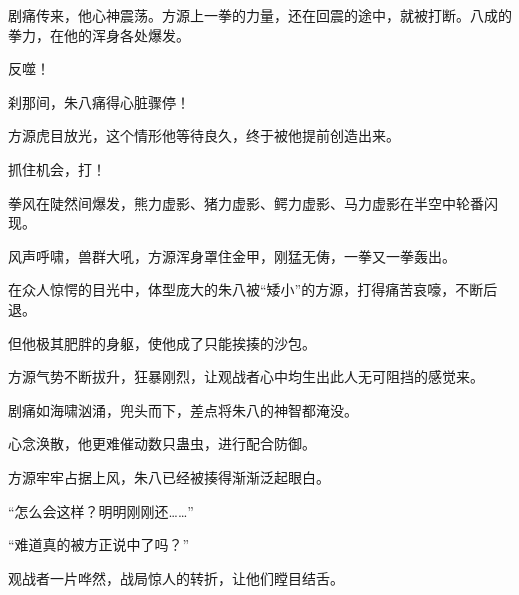 \begin{this_body}
剧痛传来，他心神震荡。方源上一拳的力量，还在回震的途中，就被打断。八成的拳力，在他的浑身各处爆发。

反噬！

刹那间，朱八痛得心脏骤停！

方源虎目放光，这个情形他等待良久，终于被他提前创造出来。

抓住机会，打！

拳风在陡然间爆发，熊力虚影、猪力虚影、鳄力虚影、马力虚影在半空中轮番闪现。

风声呼啸，兽群大吼，方源浑身罩住金甲，刚猛无俦，一拳又一拳轰出。

在众人惊愕的目光中，体型庞大的朱八被“矮小”的方源，打得痛苦哀嚎，不断后退。

但他极其肥胖的身躯，使他成了只能挨揍的沙包。

方源气势不断拔升，狂暴刚烈，让观战者心中均生出此人无可阻挡的感觉来。

剧痛如海啸汹涌，兜头而下，差点将朱八的神智都淹没。

心念涣散，他更难催动数只蛊虫，进行配合防御。

方源牢牢占据上风，朱八已经被揍得渐渐泛起眼白。

“怎么会这样？明明刚刚还……”

“难道真的被方正说中了吗？”

观战者一片哗然，战局惊人的转折，让他们瞠目结舌。

\end{this_body}

